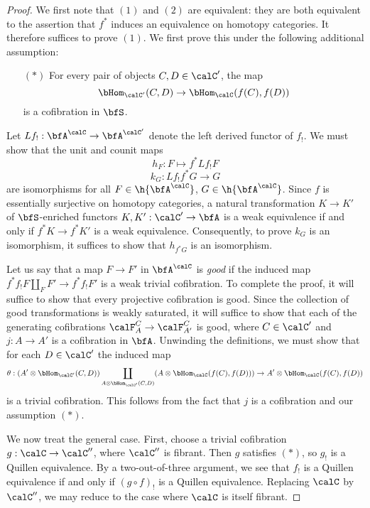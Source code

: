 \begin{proof}
We first note that $(1)$ and $(2)$ are equivalent: they are both equivalent to the assertion that
$f^{\ast}$ induces an equivalence on homotopy categories. It therefore suffices to prove $(1)$.
We first prove this under the following additional assumption:
\begin{itemize}
\item[$(\ast)$] For every pair of objects $C, D \in \calC'$, the map
$$ \bHom_{\calC'}( C,D) \rightarrow \bHom_{\calC}( f(C), f(D) )$$
is a cofibration in $\bfS$.
\end{itemize}
Let $Lf_{!}: \bfA^{\calC} \rightarrow \bfA^{\calC'}$ denote the left derived functor of $f_{!}$. We must show that the unit and counit maps
$$ h_F: F \mapsto f^{\ast} Lf_{!} F $$
$$ k_G: Lf_{!} f^{\ast} G \rightarrow G$$
are isomorphisms for all $F \in \h{\bfA^{\calC}}$, $G \in \h{\bfA^{\calC}}$. Since $f$ is essentially surjective on homotopy categories, a natural transformation $K \rightarrow K'$ of $\bfS$-enriched functors $K,K': \calC' \rightarrow \bfA$ is a weak equivalence if and only if $f^{\ast} K \rightarrow f^{\ast} K'$ is a weak equivalence. Consequently, to prove $k_G$ is an isomorphism, it suffices to show that
$h_{f^{\ast} G}$ is an isomorphism. 

Let us say that a map $F \rightarrow F'$ in $\bfA^{\calC}$ is {\it good} if the
induced map $f^{\ast} f_{!} F \coprod_{F} F' \rightarrow f^{\ast} f_{!} F'$
is a weak trivial cofibration. To complete the proof, it will suffice to show that
every projective cofibration is good. Since the collection of good transformations
is weakly saturated, it will suffice to show that each of the generating cofibrations
$\calF^{C}_{A} \rightarrow \calF^{C}_{A'}$ is good, where $C \in \calC'$ and
$j: A \rightarrow A'$ is a cofibration in $\bfA$. Unwinding the definitions, we must show that
for each $D \in \calC'$ the induced map
$$ \theta: (A' \otimes \bHom_{\calC'}(C, D)) \coprod_{ A \otimes \bHom_{\calC'}(C,D)}
(A \otimes \bHom_{\calC}(f(C), f(D))) \rightarrow A' \otimes \bHom_{\calC}( f(C), f(D) )$$
is a trivial cofibration. This follows from the fact that $j$ is a cofibration and our assumption $(\ast)$.

We now treat the general case. First, choose a trivial cofibration $g: \calC \rightarrow \calC''$, where
$\calC''$ is fibrant. Then $g$ satisfies $(\ast)$, so $g_!$ is a Quillen equivalence.
By a two-out-of-three argument, we see that $f_!$ is a Quillen equivalence if and only if
$(g \circ f)_!$ is a Quillen equivalence. Replacing $\calC$ by $\calC''$, we may
reduce to the case where $\calC$ is itself fibrant.


\end{proof}
